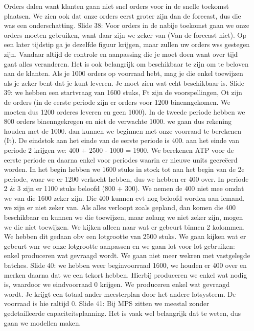 \documentclass[10pt,a4paper]{report}
\begin{document}
Orders dalen want klanten gaan niet snel orders voor in de snelle toekomst plaatsen. We zien ook dat onze orders eerst groter zijn dan de forecast, dus die was een onderschatting.
Slide 38: Voor orders in de nabije toekomst gaan we onze orders moeten gebruiken, want daar zijn we zeker van (Van de forecast niet). Op een later tijdstip ga je dezelfde figuur krijgen, maar zullen uw orders wss gestegen zijn.
Vandaar altijd de controle en aanpassing die je moet doen want over tijd gaat alles veranderen.
Het is ook belangrijk om beschikbaar te zijn om te beloven aan de klanten. Als je 1000 orders op voorraad hebt, mag je die enkel toewijzen als je zeker bent dat je kunt leveren. Je moet zien wat echt beschikbaar is.
Slide 39: we hebben een startvraag van 1600 stuks, Ft zijn de voorspellingen, Ot zijn de orders (in de eerste periode zijn er orders voor 1200 binenngekomen. We moeten dus 1200 orderes leveren en geen 1000). In de tweede periode hebben we 800 orders binenngekregen en niet de verwachte 1000. we gaan dus rekening houden met de 1000. dan kunnen we beginnen met onze voorraad te berekenen (It). De eindstok aan het einde van de eerste periode is 400. aan het einde van periode 2 krijgen we: 400 + 2500 - 1000 = 1900. We berekenen ATP voor de eerste periode en daarna enkel voor periodes waarin er nieuwe units gecreëerd worden. In het begin hebben we 1600 stuks in stock tot aan het begin van de 2e periode, waar we er 1200 verkocht hebben, dus we hebben er 400 over. In periode 2 $\&$ 3 zijn er 1100 stuks beloofd (800 + 300). We nemen de 400 niet mee omdat we van die 1600 zeker zijn. Die 400 kunnen evt nog beloofd worden aan iemand, we zijn er niet zeker van. Als alles verloopt zoals gepland, dan komen die 400 beschikbaar en kunnen we die toewijzen, maar zolang we niet zeker zijn, mogen we die niet toewijzen. We kijken alleen naar wat er gebeurt binnen 2 kolommen.
We hebben dit gedaan obv een lotgrootte van 2500 stuks. We gaan kijken wat er gebeurt wnr we onze lotgrootte aanpassen en we gaan lot voor lot gebruiken: enkel produceren wat gevraagd wordt. We gaan niet meer wekren met vastgelegde batches.
Slide 40: we hebben weer beginvoorraad 1600, we houden er 400 over en merken daarna dat we een tekort hebben. Hierbij produceren we enkel wat nodig is, waardoor we eindvoorraad 0 krijgen. We produceren enkel wat gevraagd wordt. Je krijgt een totaal ander meesterplan door het andere lotsysteem. De voorraad is hie raltijd 0.
Slide 41: Bij MPS zitten we meestal zonder gedetailleerde capaciteitsplanning. Het is vaak wel belangrijk dat te weten, dus gaan we modellen maken.
\end{document}
